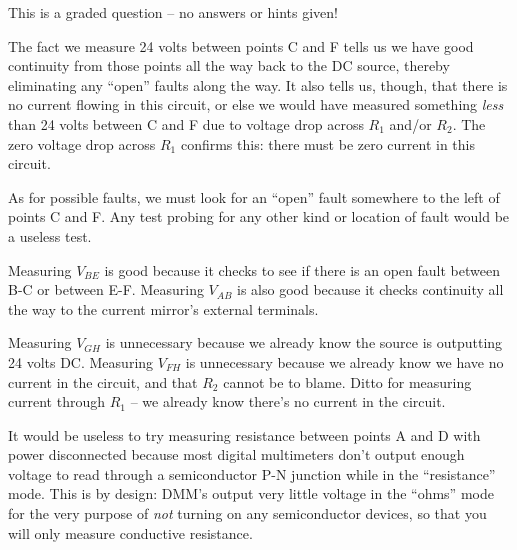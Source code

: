 \vfil 

\eject






This is a graded question -- no answers or hints given!







The fact we measure 24 volts between points C and F tells us we have good continuity from those points all the way back to the DC source, thereby eliminating any ``open'' faults along the way.  It also tells us, though, that there is no current flowing in this circuit, or else we would have measured something {\it less} than 24 volts between C and F due to voltage drop across $R_1$ and/or $R_2$.  The zero voltage drop across $R_1$ confirms this: there must be zero current in this circuit.

\vskip 10pt

As for possible faults, we must look for an ``open'' fault somewhere to the left of points C and F.  Any test probing for any other kind or location of fault would be a useless test.

\vskip 10pt

Measuring $V_{BE}$ is good because it checks to see if there is an open fault between B-C or between E-F.  Measuring $V_{AB}$ is also good because it checks continuity all the way to the current mirror's external terminals.

\vskip 10pt

Measuring $V_{GH}$ is unnecessary because we already know the source is outputting 24 volts DC.  Measuring $V_{FH}$ is unnecessary because we already know we have no current in the circuit, and that $R_2$ cannot be to blame.  Ditto for measuring current through $R_1$ -- we already know there's no current in the circuit.  

\vskip 10pt

It would be useless to try measuring resistance between points A and D with power disconnected because most digital multimeters don't output enough voltage to read through a semiconductor P-N junction while in the ``resistance'' mode.  This is by design: DMM's output very little voltage in the ``ohms'' mode for the very purpose of {\it not} turning on any semiconductor devices, so that you will only measure conductive resistance.

